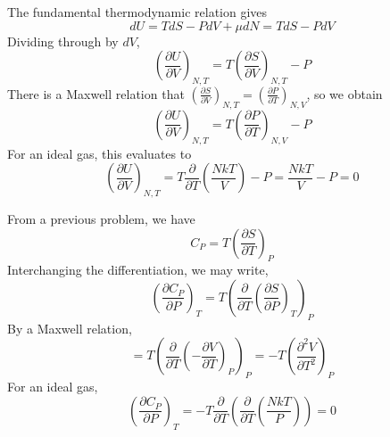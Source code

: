 \documentclass{article}
\begin{document}
The fundamental thermodynamic relation gives
\[dU=TdS-PdV+\mu dN=TdS-PdV\]
Dividing through by $dV$,
\[\left( \frac{\partial U}{\partial V}\right)_{N,T}=T\left( \frac{\partial S}{\partial V} \right)_{N,T}-P\]
There is a Maxwell relation that $\left( \frac{\partial S}{\partial V} \right)_{N,T}=\left( \frac{\partial P}{\partial T} \right)_{N,V}$, so we obtain
\[\left( \frac{\partial U}{\partial V} \right)_{N,T}=T\left( \frac{\partial P}{\partial T} \right)_{N,V}-P\]
For an ideal gas, this evaluates to
\[\left( \frac{\partial U}{\partial V} \right)_{N,T}=T\frac{\partial }{\partial T}\left(\frac{NkT}{V}  \right)-P=\frac{NkT}{V}-P=0\]


From a previous problem, we have
\[C_{P}=T\left( \frac{\partial S }{\partial T} \right)_{P}\]
Interchanging the differentiation, we may write,
\[\left( \frac{\partial C_{P}}{\partial P} \right)_{T}=T\left( \frac{\partial}{\partial T}\left( \frac{\partial S}{\partial P} \right)_{T} \right)_{P}\]
By a Maxwell relation,
\[=T\left( \frac{\partial}{\partial T}\left(-\frac{\partial V}{\partial T}  \right)_{P} \right)_{P}=-T\left( \frac{\partial ^{2}V}{\partial T^{2}} \right)_{P}\]
For an ideal gas,
\[\left( \frac{\partial C_{P}}{\partial P} \right)_{T}=-T\frac{\partial}{\partial T}\left( \frac{\partial }{\partial T}\left( \frac{NkT}{P} \right) \right)=0\]
\end{document}
